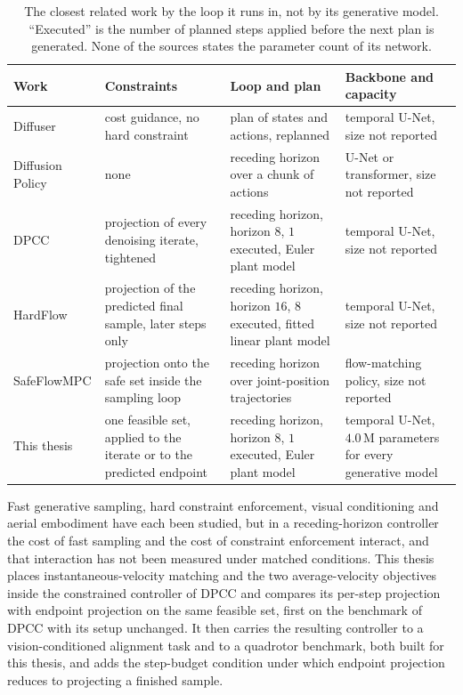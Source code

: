 \begin{table}[htpb]
  \caption[Planner, loop and constraint mechanism in the closest related work]{The closest related
  work by the loop it runs in, not by its generative model. ``Executed'' is the number of planned
  steps applied before the next plan is generated. None of the sources states the parameter count of
  its network.}
  \label{tab:related-loops}
  \centering\small
  \begin{tabularx}{\linewidth}{lLLL}
    \toprule
    Work & Constraints & Loop and plan & Backbone and capacity \\
    \midrule
    Diffuser \parencite{janner2022planning}
      & cost guidance, no hard constraint
      & plan of states and actions, replanned
      & temporal U-Net, size not reported \\
    Diffusion Policy \parencite{chi2023diffusion}
      & none
      & receding horizon over a chunk of actions
      & U-Net or transformer, size not reported \\
    \ac{DPCC} \parencite{romer2025diffusion}
      & projection of every denoising iterate, tightened
      & receding horizon, horizon $8$, $1$ executed, Euler plant model
      & temporal U-Net, size not reported \\
    HardFlow \parencite{li2025hardflow}
      & projection of the predicted final sample, later steps only
      & receding horizon, horizon $16$, $8$ executed, fitted linear plant model
      & temporal U-Net, size not reported \\
    SafeFlowMPC \parencite{oelerich2026safeflowmpc}
      & projection onto the safe set inside the sampling loop
      & receding horizon over joint-position trajectories
      & flow-matching policy, size not reported \\
    This thesis
      & one feasible set, applied to the iterate or to the predicted endpoint
      & receding horizon, horizon $8$, $1$ executed, Euler plant model
      & temporal U-Net, $4.0$\,M parameters for every generative model \\
    \bottomrule
  \end{tabularx}
\end{table}

Fast generative sampling, hard constraint enforcement, visual conditioning and aerial embodiment have
each been studied, but in a receding-horizon controller the cost of fast sampling and the cost of
constraint enforcement interact, and that interaction has not been measured under matched conditions.
This thesis places instantaneous-velocity matching and the two average-velocity objectives inside the
constrained controller
of \ac{DPCC} and compares its per-step projection with endpoint projection \parencite{li2025hardflow}
on the same feasible set, first on the benchmark of \ac{DPCC} with its setup unchanged. It then carries
the resulting controller to a vision-conditioned alignment task and to a quadrotor benchmark, both built
for this thesis, and adds the step-budget condition under which endpoint projection reduces to
projecting a finished sample.

